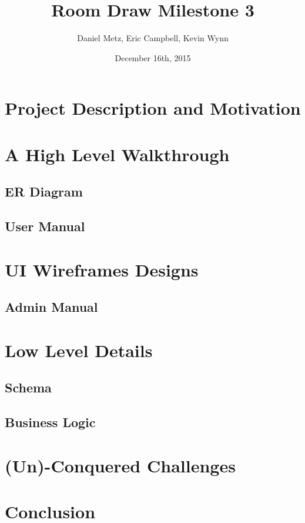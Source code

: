 \documentclass{article}
\title{Room Draw Milestone 3}
\author{Daniel Metz, Eric Campbell, Kevin Wynn}
\date{December 16th, 2015}
\begin{document}
\maketitle

\section{Project Description and Motivation}


% 

\section{A High Level Walkthrough}
  \subsection{ER Diagram}
  

  \subsection{User Manual}
  \section{UI Wireframes Designs}
  

  \subsection{Admin Manual}
  

\section{Low Level Details}
  \subsection{Schema}
  

  \subsection{Business Logic}
  

\section{(Un)-Conquered Challenges}

\section{Conclusion}
\end{document}
